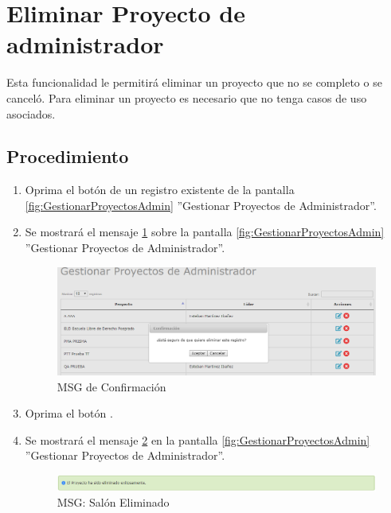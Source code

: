 \hypertarget{cv:eliminarProyecto}{\section{Eliminar Proyecto de administrador}} \label{sec:eliminarProyecto}

	Esta funcionalidad le permitirá eliminar un proyecto que no se completo o se canceló. Para eliminar un proyecto es necesario que no tenga casos de uso asociados.

		\subsection{Procedimiento}

			\begin{enumerate}
	
			\item Oprima el botón \IUBotonEliminar{} de un registro existente de la pantalla \ref{fig:GestionarProyectosAdmin} ''Gestionar Proyectos de Administrador''.
	
			\item Se mostrará el mensaje \ref{fig:confirmaEliminaProyecto} sobre la pantalla \ref{fig:GestionarProyectosAdmin} ''Gestionar Proyectos de Administrador''.
			
			\begin{figure}[htbp!]
				\begin{center}
					\includegraphics[scale=0.6]{roles/administrador/proyectosAdmin/gestionarproyectosAdmin/pantallas/IU2-3MSG10}
					\caption{MSG de Confirmación}
					\label{fig:confirmaEliminaProyecto}
				\end{center}
			\end{figure}
						
			\item Oprima el botón \IUAceptar.
			
			\item Se mostrará el mensaje \ref{fig:proyectoEliminado} en la pantalla \ref{fig:GestionarProyectosAdmin} ''Gestionar Proyectos de Administrador''.
			
			\begin{figure}[htbp!]
				\begin{center}
					\includegraphics[scale=0.6]{roles/administrador/proyectosAdmin/gestionarproyectosAdmin/pantallas/IU2-3MSG1}
					\caption{MSG: Salón Eliminado}
					\label{fig:proyectoEliminado}
				\end{center}
			\end{figure}
			\end{enumerate}